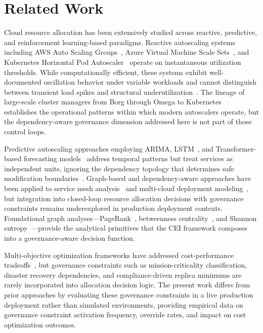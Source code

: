 \documentclass[runningheads]{llncs}
\begin{document}
\section{Related Work}
\label{sec:related}

Cloud resource allocation has been extensively studied across reactive, predictive, and reinforcement learning-based paradigms. Reactive autoscaling systems including AWS Auto Scaling Groups~\cite{aws_autoscale}, Azure Virtual Machine Scale Sets~\cite{azure_autoscale}, and Kubernetes Horizontal Pod Autoscaler~\cite{kubernetes_hpa} operate on instantaneous utilization thresholds. While computationally efficient, these systems exhibit well-documented oscillation behavior under variable workloads and cannot distinguish between transient load spikes and structural underutilization~\cite{roy}. The lineage of large-scale cluster managers from Borg through Omega to Kubernetes~\cite{burns_borg,borg_omega_kubernetes,verma_kubernetes} establishes the operational patterns within which modern autoscalers operate, but the dependency-aware governance dimension addressed here is not part of those control loops.

Predictive autoscaling approaches employing ARIMA, LSTM~\cite{hochreiter_lstm}, and Transformer-based forecasting models~\cite{vaswani_attention} address temporal patterns but treat services as independent units, ignoring the dependency topology that determines safe modification boundaries~\cite{guo}. Graph-based and dependency-aware approaches have been applied to service mesh analysis~\cite{istio_servicemesh} and multi-cloud deployment modeling~\cite{wettinger}, but integration into closed-loop resource allocation decisions with governance constraints remains underexplored in production deployment contexts. Foundational graph analyses---PageRank~\cite{pagerank_origin}, betweenness centrality~\cite{brandes_centrality}, and Shannon entropy~\cite{shannon_entropy}---provide the analytical primitives that the CEI framework composes into a governance-aware decision function.

Multi-objective optimization frameworks have addressed cost-performance tradeoffs~\cite{nguyen}, but governance constraints such as mission-criticality classification, disaster recovery dependencies, and compliance-driven replica minimums are rarely incorporated into allocation decision logic. The present work differs from prior approaches by evaluating these governance constraints in a live production deployment rather than simulated environments, providing empirical data on governance constraint activation frequency, override rates, and impact on cost optimization outcomes.
\end{document}
